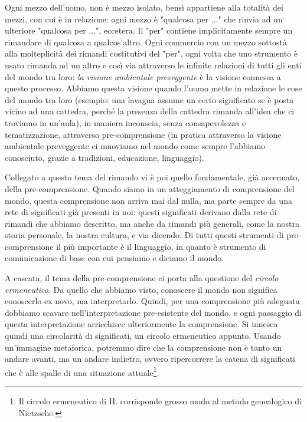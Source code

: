 \documentclass[a4paper,12pt,oneside]{article}%
\begin{document}
Ogni mezzo dell'uomo, non è mezzo isolato, bensì appartiene alla totalità dei mezzi, con cui è in relazione: ogni mezzo è "qualcosa per ..." che rinvia ad un ulteriore "qualcosa per ...", eccetera. Il "per" contiene implicitamente sempre un rimandare di qualcosa a qualcos'altro. Ogni commercio con un mezzo sottostà alla molteplicità dei rimandi costitutivi del "per", ogni volta che uno strumento è usato rimanda ad un altro e così via attraverso le infinite relazioni di tutti gli enti del mondo tra loro: \textit{la visione ambientale preveggente} è la visione connessa a questo processo. Abbiamo questa visione quando l'uomo mette in relazione le cose del mondo tra loro (esempio: una lavagna assume un certo significato se è posta vicino ad una cattedra, perché la presenza della cattedra rimanda all’idea che ci troviamo in un’aula), in maniera inconscia, senza consapevolezza e tematizzazione, attraverso pre-comprensione (in pratica attraverso la visione ambientale preveggente ci muoviamo nel mondo come sempre l'abbiamo conosciuto, grazie a tradizioni, educazione, linguaggio).

Collegato a questo tema del rimando vi è poi quello fondamentale, già accennato, della pre-comprensione. Quando siamo in un atteggiamento di comprensione del mondo, questa comprensione non arriva mai dal nulla, ma parte sempre da una rete di significati già presenti in noi: questi significati derivano dalla rete di rimandi che abbiamo descritto, ma anche da rimandi più generali, come la nostra storia personale, la nostra cultura, e via dicendo. Di tutti questi strumenti di pre-comprensione il più importante è il linguaggio, in quanto è strumento di comunicazione di base con cui pensiamo e diciamo il mondo. 

A cascata,  il tema della pre-comprensione ci porta alla questione del \textit{circolo ermeneutico}. Da quello che abbiamo visto, conoscere il mondo non significa conoscerlo ex novo, ma interpretarlo. Quindi, per una comprensione più adeguata dobbiamo scavare nell’interpretazione pre-esistente del mondo, e ogni passaggio di questa interpretazione arricchisce ulteriormente la comprensione. Si innesca quindi una circolarità di significati, un circolo ermeneutico appunto. Usando un’immagine metaforica, potremmo dire che la comprensione non è tanto un andare avanti, ma un andare indietro, ovvero ripercorrere la catena di significati che è alle spalle di una situazione attuale\footnote{Il circolo ermeneutico di H. corrisponde grosso modo al metodo genealogico di Nietzsche.}.
\end{document}

